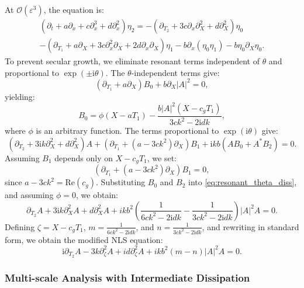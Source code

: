 \documentclass[alpha-refs, 12pt]{wiley-article}
\renewcommand{\O}{\mathcal{O}}
\newcommand{\ui}{\mathrm{i}}
\newcommand{\eps}{\varepsilon}
\begin{document}
At $\O(\eps^3)$, the equation is:
\begin{multline}
\label{eq:third_order_diss}
\left( \partial_t + a \partial_x + c \partial_x^3 + d \partial_x^2 \right) \eta_2 = - \left( \partial_{T_2} + 3 c \partial_x \partial_X^2 + d \partial_X^2 \right) \eta_0 \\
- \left( \partial_{T_1} + a \partial_X + 3 c \partial_x^2 \partial_X + 2 d \partial_x \partial_X \right) \eta_1 - b \partial_x ( \eta_0 \eta_1 ) - b \eta_0 \partial_X \eta_0.
\end{multline}
To prevent secular growth, we eliminate resonant terms independent of $\theta$ and proportional to $\exp(\pm \ui \theta)$. The $\theta$-independent terms give:
\begin{equation}
\label{eq:B0_equation_diss}
  \left( \partial_{T_1} + a \partial_X \right) B_0 + b \partial_X |A|^2 = 0,
\end{equation}
yielding:
\[
  B_0 = \phi(X - a T_1) - \frac{b |A|^2 (X - c_g T_1)}{3 c k^2 - 2 \ui d k},
\]
where $\phi$ is an arbitrary function. The terms proportional to $\exp(\ui \theta)$ give:
\begin{equation}\label{eq:resonant_theta_diss}
  \left( \partial_{T_2} + 3 \ui k \partial_X^2 + d \partial_X^2 \right) A + \left( \partial_{T_1} + (a - 3 c k^2) \partial_X \right) B_1 + \ui k b \left( A B_0 + A^* B_2 \right) = 0.
\end{equation}
Assuming $B_1$ depends only on $X - c_g T_1$, we set:
\[
\left( \partial_{T_1} + (a - 3 c k^2) \partial_X \right) B_1 = 0,
\]
since $a - 3 c k^2 = \text{Re}(c_g)$. Substituting $B_0$ and $B_2$ into \eqref{eq:resonant_theta_diss}, and assuming $\phi = 0$, we obtain:
\begin{equation*}%
  \partial_{T_2} A + 3 \ui k \partial_X^2 A + d \partial_X^2 A + i k b^2 \left( \frac{1}{6 c k^2 - 2 \ui d k} - \frac{1}{3 c k^2 - 2 \ui d k} \right) |A|^2 A = 0.
\end{equation*}
Defining $\zeta = X - c_g T_1$, $m = \frac{1}{6 c k^2 - 2 \ui d k}$, and $n = \frac{1}{3 c k^2 - 2 \ui d k}$, and rewriting in standard form, we obtain the modified NLS equation:
\begin{equation}\label{eq:NLS_final_diss}
  \ui \partial_{T_2} A - 3 k \partial_\zeta^2 A + i d \partial_\zeta^2 A + i k b^2 (m - n) |A|^2 A = 0.
\end{equation}

\subsubsection{Multi-scale Analysis with Intermediate Dissipation}
\end{document}

